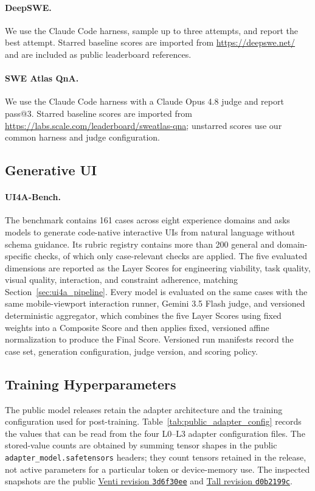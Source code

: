 \paragraph{DeepSWE.} We use the Claude Code harness, sample up to three attempts, and report the best attempt. Starred baseline scores are imported from \url{https://deepswe.net/} and are included as public leaderboard references.

\paragraph{SWE Atlas QnA.} We use the Claude Code harness with a Claude Opus 4.8 judge and report pass@3. Starred baseline scores are imported from \url{https://labs.scale.com/leaderboard/sweatlas-qna}; unstarred scores use our common harness and judge configuration.

\subsection{Generative UI}

\paragraph{UI4A-Bench.} The benchmark contains 161 cases across eight experience domains and asks models to generate code-native interactive UIs from natural language without schema guidance. Its rubric registry contains more than 200 general and domain-specific checks, of which only case-relevant checks are applied. The five evaluated dimensions are reported as the Layer Scores for engineering viability, task quality, visual quality, interaction, and constraint adherence, matching Section~\ref{sec:ui4a_pipeline}. Every model is evaluated on the same cases with the same mobile-viewport interaction runner, Gemini 3.5 Flash judge, and versioned deterministic aggregator, which combines the five Layer Scores using fixed weights into a Composite Score and then applies fixed, versioned affine normalization to produce the Final Score. Versioned run manifests record the case set, generation configuration, judge version, and scoring policy.

\subsection{Training Hyperparameters}
\label{app:training_details}

The public model releases retain the adapter architecture and the training
configuration used for post-training. Table~\ref{tab:public_adapter_config}
records the values that
can be read from the four L0--L3 adapter configuration files. The stored-value
counts are obtained by summing tensor shapes in the public
\texttt{adapter\_model.safetensors} headers; they count tensors retained in the
release, not active parameters for a particular token or device-memory use.
The inspected snapshots are the public
\href{https://huggingface.co/mindlab-research/Macaron-V1-Venti/tree/3d6f30eea38663a7b9320f3a6b28822ed4aa7ac4/loras}{Venti revision \texttt{3d6f30ee}}
and
\href{https://huggingface.co/mindlab-research/Macaron-V1-Tall/tree/d0b2199c3572d336bcfe9e027ec519314cf608bd/loras}{Tall revision \texttt{d0b2199c}}.

